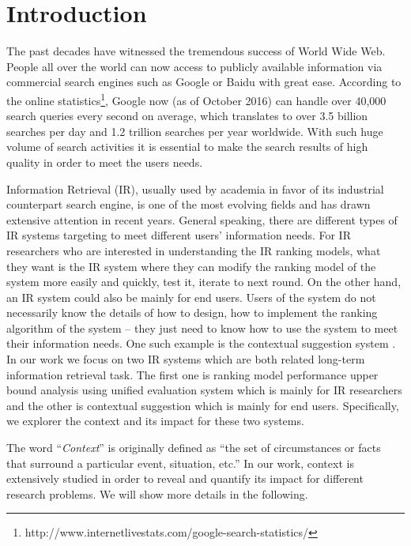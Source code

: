 %
%
\chapter{Introduction}
The past decades have witnessed the tremendous success of World Wide Web. 
People all over the world can now access to publicly available 
information via commercial search engines such as Google or Baidu 
with great ease. According to the online statistics\footnote{http://www.internetlivestats.com/google-search-statistics/}, 
Google now (as of October 2016) can handle over 40,000 search queries 
every second on average, which translates to over 3.5 billion searches 
per day and 1.2 trillion searches per year worldwide. 
With such huge volume of search activities it is essential to make the 
search results of high quality in order to meet the users needs.

Information Retrieval (IR), usually used by academia in favor of its 
industrial counterpart search engine, is one of the most evolving fields 
and has drawn extensive attention in recent years.
General speaking, there are different types of IR systems targeting to meet 
different users' information needs. 
For IR researchers who are interested in understanding the IR ranking models, 
what they want is the IR system where they can modify the ranking model of 
the system more easily and quickly, test it, iterate to next round.
On the other hand, an IR system could also be mainly for end users. 
Users of the system do not necessarily know the details of how to design, 
how to implement the ranking algorithm of the system -- they just need to know 
how to use the system to meet their information needs. One such example is 
the contextual suggestion system \cite{udel:treccs2013,udel:treccs2014,udel:treccs2015,Yang:2013:OUP:2499178.2499191,Yang2015}.
In our work we focus on two IR systems which are both related long-term 
information retrieval task. The first one is ranking model performance 
upper bound analysis using unified evaluation system which is mainly for 
IR researchers and the other is contextual suggestion which is mainly for 
end users. Specifically, we explorer the context and its impact for these 
two systems.

The word ``\textit{Context}'' is originally defined as 
``the set of circumstances or facts that surround a particular event, situation, etc.''
In our work, context is extensively studied in order to reveal and quantify 
its impact for different research problems. We will show more details 
in the following.

